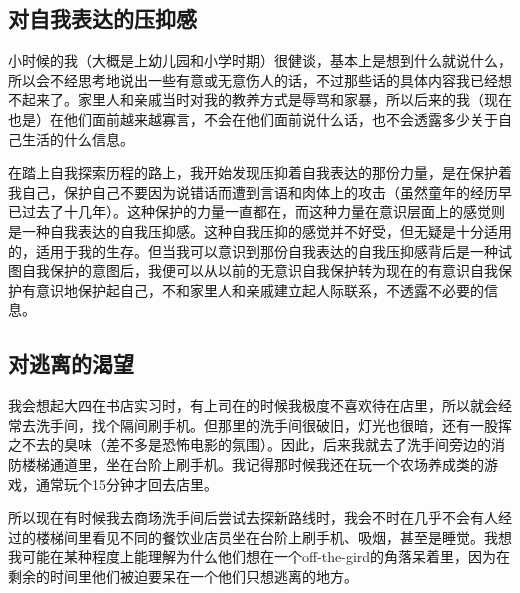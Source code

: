 





\subsection*{对自我表达的压抑感}

小时候的我（大概是上幼儿园和小学时期）很健谈，基本上是想到什么就说什么，所以会不经思考地说出一些有意或无意伤人的话，不过那些话的具体内容我已经想不起来了。家里人和亲戚当时对我的教养方式是辱骂和家暴，所以后来的我（现在也是）在他们面前越来越寡言，不会在他们面前说什么话，也不会透露多少关于自己生活的什么信息。

在踏上自我探索历程的路上，我开始发现压抑着自我表达的那份力量，是在保护着我自己，保护自己不要因为说错话而遭到言语和肉体上的攻击（虽然童年的经历早已过去了十几年）。这种保护的力量一直都在，而这种力量在意识层面上的感觉则是一种自我表达的自我压抑感。这种自我压抑的感觉并不好受，但无疑是十分适用的，适用于我的生存。但当我可以意识到那份自我表达的自我压抑感背后是一种试图自我保护的意图后，我便可以从以前的无意识自我保护转为现在的有意识自我保护\pozhehao{}有意识地保护起自己，不和家里人和亲戚建立起人际联系，不透露不必要的信息。







\subsection*{对逃离的渴望}

我会想起大四在书店实习时，有上司在的时候我极度不喜欢待在店里，所以就会经常去洗手间，找个隔间刷手机。但那里的洗手间很破旧，灯光也很暗，还有一股挥之不去的臭味（差不多是恐怖电影的氛围）。因此，后来我就去了洗手间旁边的消防楼梯通道里，坐在台阶上刷手机。我记得那时候我还在玩一个农场养成类的游戏，通常玩个15分钟才回去店里。

所以现在有时候我去商场洗手间后尝试去探新路线时，我会不时在几乎不会有人经过的楼梯间里看见不同的餐饮业店员坐在台阶上刷手机、吸烟，甚至是睡觉。我想我可能在某种程度上能理解为什么他们想在一个off-the-gird的角落呆着里，因为在剩余的时间里他们被迫要呆在一个他们只想逃离的地方。







